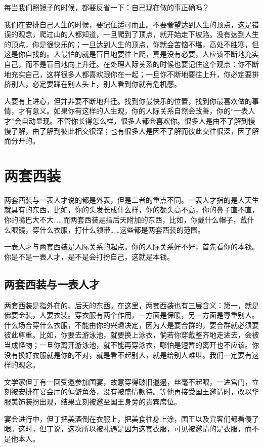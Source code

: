 \documentclass[fontset=fandol, a4paper, 12pt, openright]{ctexbook}
\begin{document}
每当我们照镜子的时候，都要反省一下：自己现在做的事正确吗？

我们在安排自己人生的时候，要记住适可而止。不要奢望达到人生的顶点，这是错误的观念，爬过山的人都知道，一旦爬到了顶点，就开始走下坡路。没有达到人生的顶点，你是很快乐的；一旦达到人生的顶点，你就会苦恼不堪，高处不胜寒，但这是你自找的。人最怕的就是盲目地要往上爬，真是没有必要，人应该不断地充实自己，而不是盲目地向上升迁。在处理人际关系的时候也要记住这个观点：你不断地充实自己，这样很多人都喜欢跟你在一起；一旦你不断地要往上升，你必定要排挤别人，必定要踩在别人头上，别人看到你就有危机感。

人要有上进心，但并非要不断地升迁。找到你最快乐的位置，找到你最喜欢做的事情，才有意义。如果你有这样的人生观，你的人际关系自然会改善，你的“一表人才”会自动显现。不管你长得怎么样，很多人都会喜欢你。很多人是由不了解到慢慢了解，由了解到彼此相交很深；也有很多人是因不了解而彼此交往很深，因了解而分开的。


\chapter{两套西装}
两套西装与一表人才说的都是外表，但是二者的重点不同。一表人才指的是人天生就具有的东西，比如，你的头发长成什么样，你的额头高不高，你的鼻子直不直，你的嘴巴大不大……而两套西装是指后天附加的东西，比如，你戴什么帽子，戴什么眼镜，穿什么衣服，打什么领带……这些都是两套西装的范围。

一表人才与两套西装是人际关系的起点。你的人际关系好不好，首先看你的本钱。你是不是一表人才，是不是会打扮自己，这就是本钱。

\section{两套西装与一表人才}

两套西装是指外在的、后天的东西。在这里，两套西装也有三层含义：第一，就是佛要金装，人要衣装。穿衣服有两个作用，一方面是保暖，另一方面是尊重别人。什么场合穿什么衣服，不能由你的兴趣决定，因为人是要合群的，要合群就必须要彼此尊重。比如，你要去游泳池，就要换上泳衣，倘若你穿戴整齐地走进去，会被当成怪物；一旦你离开游泳池，就不能再穿泳衣，哪怕是短暂的离开也不应该。你没有换好衣服就是你的不对，就是看不起别人，就是给别人难堪。我们一定要有这样的观念。

文学家但丁有一回受邀参加国宴，故意穿得破旧邋遢，丝毫不起眼，一进宫门，立刻被安排在宴会厅的偏僻角落，没有被盛情款待。等他再接受国王邀请时，改以华服美饰装扮出现，结果立刻被邀至国王身旁的贵宾席位。

宴会进行中，但丁把美酒倒在衣服上，把美食往身上涂，国王以及宾客们都看傻了眼。这时，但丁说，这次所以被礼遇是因为这套衣服，可见被邀请的是衣服，而不是他本人。
\end{document}
